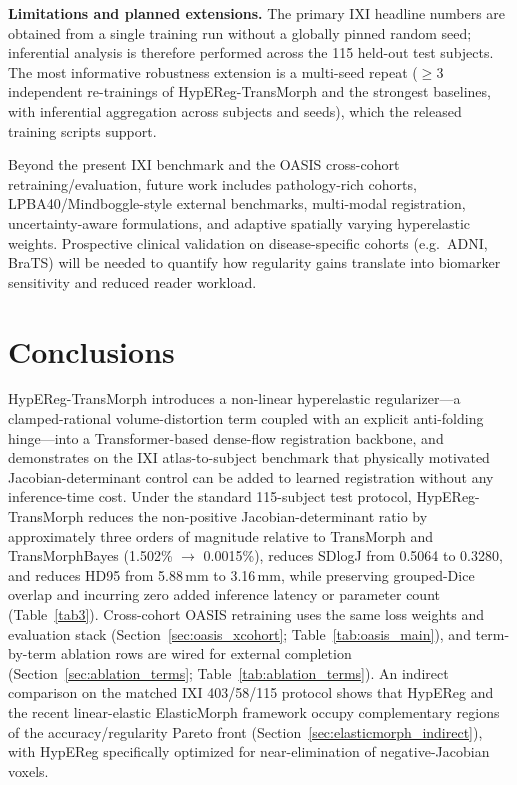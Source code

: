\documentclass[jimaging,article,submit,pdftex,moreauthors]{Definitions/mdpi}
\begin{document}
\noindent\textbf{Limitations and planned extensions.}\label{sec:limitations}
The primary IXI headline numbers are obtained from a single training run without a globally pinned random seed; inferential analysis is therefore performed across the 115 held-out test subjects. The most informative robustness extension is a multi-seed repeat ($\geq 3$ independent re-trainings of HypEReg-TransMorph and the strongest baselines, with inferential aggregation across subjects and seeds), which the released training scripts support.

Beyond the present IXI benchmark and the OASIS cross-cohort retraining/evaluation, future work includes pathology-rich cohorts, LPBA40/Mindboggle-style external benchmarks, multi-modal registration, uncertainty-aware formulations, and adaptive spatially varying hyperelastic weights. Prospective clinical validation on disease-specific cohorts (e.g.\ ADNI, BraTS) will be needed to quantify how regularity gains translate into biomarker sensitivity and reduced reader workload.

\section{Conclusions}

HypEReg-TransMorph introduces a non-linear hyperelastic regularizer---a clamped-rational volume-distortion term coupled with an explicit anti-folding hinge---into a Transformer-based dense-flow registration backbone, and demonstrates on the IXI atlas-to-subject benchmark that physically motivated Jacobian-determinant control can be added to learned registration without any inference-time cost. Under the standard 115-subject test protocol, HypEReg-TransMorph reduces the non-positive Jacobian-determinant ratio by approximately three orders of magnitude relative to TransMorph and TransMorphBayes (1.502\% $\to$ 0.0015\%), reduces SDlogJ from 0.5064 to 0.3280, and reduces HD95 from 5.88\,mm to 3.16\,mm, while preserving grouped-Dice overlap and incurring zero added inference latency or parameter count (Table~\ref{tab3}). Cross-cohort OASIS retraining uses the same loss weights and evaluation stack (Section~\ref{sec:oasis_xcohort}; Table~\ref{tab:oasis_main}), and term-by-term ablation rows are wired for external completion (Section~\ref{sec:ablation_terms}; Table~\ref{tab:ablation_terms}). An indirect comparison on the matched IXI 403/58/115 protocol shows that HypEReg and the recent linear-elastic ElasticMorph framework occupy complementary regions of the accuracy/regularity Pareto front (Section~\ref{sec:elasticmorph_indirect}), with HypEReg specifically optimized for near-elimination of negative-Jacobian voxels.
\end{document}
